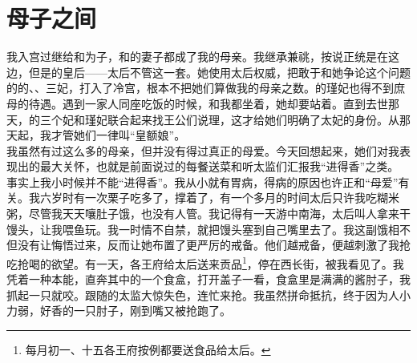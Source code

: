 \fancyhead[RO]{} %
\fancyhead[LE]{} %
\chapter*{母子之间}
\thispagestyle{empty}
我入宫过继给和为子，和的妻子都成了我的母亲。我继承兼祧，按说正统是在这边，但是的皇后——太后不管这一套。她使用太后权威，把敢于和她争论这个问题的的、、三妃，打入了冷宫，根本不把她们算做我的母亲之数。的瑾妃也得不到庶母的待遇。遇到一家人同座吃饭的时候，和我都坐着，她却要站着。直到去世那天，的三个妃和瑾妃联合起来找王公们说理，这才给她们明确了太妃的身份。从那天起，我才管她们一律叫“皇额娘”。\\

我虽然有过这么多的母亲，但并没有得过真正的母爱。今天回想起来，她们对我表现出的最大关怀，也就是前面说过的每餐送菜和听太监们汇报我“进得香”之类。\\

事实上我小时候并不能“进得香”。我从小就有胃病，得病的原因也许正和“母爱”有关。我六岁时有一次栗子吃多了，撑着了，有一个多月的时间太后只许我吃糊米粥，尽管我天天嚷肚子饿，也没有人管。我记得有一天游中南海，太后叫人拿来干馒头，让我喂鱼玩。我一时情不自禁，就把馒头塞到自己嘴里去了。我这副饿相不但没有让悔悟过来，反而让她布置了更严厉的戒备。他们越戒备，便越刺激了我抢吃抢喝的欲望。有一天，各王府给太后送来贡品\footnote{每月初一、十五各王府按例都要送食品给太后。}，停在西长街，被我看见了。我凭着一种本能，直奔其中的一个食盒，打开盖子一看，食盒里是满满的酱肘子，我抓起一只就咬。跟随的太监大惊失色，连忙来抢。我虽然拼命抵抗，终于因为人小力弱，好香的一只肘子，刚到嘴又被抢跑了。\\

